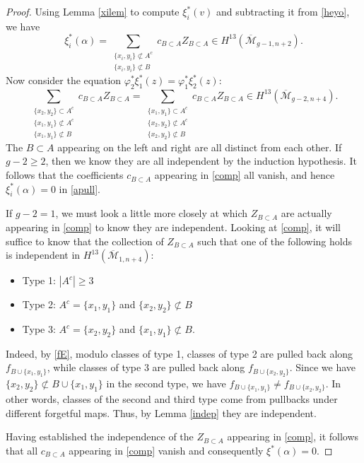 \documentclass[12pt]{amsart}
\theoremstyle{definition}
\numberwithin{equation}{section}
\newcommand{\M}{\mathcal{M}}
\newcommand{\Mb}{\overline{\M}}
\theoremstyle{definition} %
\theoremstyle{remark}
\begin{document}
\begin{proof}
Using Lemma \ref{xilem} to compute $\xi_i^*(v)$ and subtracting it from \eqref{heyo}, we have
\begin{equation} \label{apull} \xi_i^*(\alpha) = \sum_{\substack{\{x_i, y_i\} \not\subset A^c \\  \{x_i, y_i\} \not\subset B}} c_{B \subset A} Z_{B \subset A} \in H^{13}(\Mb_{g-1,n+2}).
\end{equation}
Now consider the equation $\varphi_2^*\xi_1^*(z) = \varphi_1^*\xi_2^*(z)$:
\begin{equation} \label{comp} \sum_{\substack{\{x_2,y_2\} \subset A^c \\ \{x_1, y_1\} \not\subset A^c \\  \{x_1, y_1\} \not\subset B}} c_{B \subset A} Z_{B \subset A}
= 
\sum_{\substack{\{x_1,y_1\} \subset A^c \\ \{x_2, y_2\} \not\subset A^c \\  \{x_2, y_2\} \not\subset B}} c_{B \subset A} Z_{B \subset A}
\in H^{13}(\Mb_{g-2,n+4}). \end{equation}
The $B \subset A$ appearing on the left and right are all distinct from each other.
If $g - 2 \geq 2$, then we know they are all independent by the induction hypothesis. It follows that the coefficients $c_{B \subset A}$ appearing in \eqref{comp} all vanish, and hence $\xi_i^*(\alpha) = 0$ in \eqref{apull}.

If $g - 2 = 1$, we must look a little more closely at which $Z_{B \subset A}$ are actually appearing in \eqref{comp} to know they are independent. Looking at \eqref{comp}, it will suffice to know that the collection of $Z_{B \subset A}$ such that one of the following holds is independent in $H^{13}(\Mb_{1,n+4})$:
\begin{itemize}
    \item Type 1: $|A^c| \geq 3$
    \item Type 2: $A^c = \{x_1, y_1\}$ and $\{x_2, y_2\} \not\subset B$
    \item Type 3: $A^c = \{x_2, y_2\}$ and $\{x_1, y_1\} \not\subset B$.
\end{itemize}
Indeed, by \eqref{fE}, modulo classes of type 1, classes of type 2 are pulled back along $f_{B \cup \{x_1, y_1\}}$, while classes of type 3 are pulled back along $f_{B \cup \{x_2,y_2\}}$. Since we have $\{x_2, y_2\} \not\subset B \cup \{x_1,y_1\}$ 
in the second type, we have $f_{B \cup \{x_1, y_1\}} \neq f_{B \cup \{x_2, y_2\}}$. In other words,
classes of the second and third type come from pullbacks under different forgetful maps. Thus, by Lemma \ref{indep} they are independent.

Having established the independence of the $Z_{B \subset A}$ appearing in \eqref{comp}, it follows that all $c_{B \subset A}$ appearing in \eqref{comp} vanish and consequently $\xi^*(\alpha) = 0$.
\end{proof}
\end{document}
